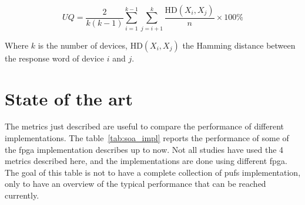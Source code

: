 \begin{equation}
    UQ =\frac{2}{k(k-1)} \sum_{i=1}^{k-1} \sum_{j=i+1}^k \frac{\mathrm{HD}\left(X_i, X_j\right)}{n} \times 100\%
\end{equation}

Where $k$ is the number of devices, $\mathrm{HD}\left(X_i, X_j\right)$ the Hamming distance between the response word of device $i$ and $j$.


\newpage
\section{State of the art}
\label{sec:SOACompa}

The metrics just described are useful to compare the performance of different implementations. The table~\ref{tab:soa_impl} reports the performance of some of the \acrshort{fpga} implementation describes up to now. Not all studies have used the 4 metrics described here, and the implementations are done using different \acrshort{fpga}. The goal of this table is not to have a complete collection of \acrshort{puf}s implementation, only to have an overview of the typical performance that can be reached currently.\\

